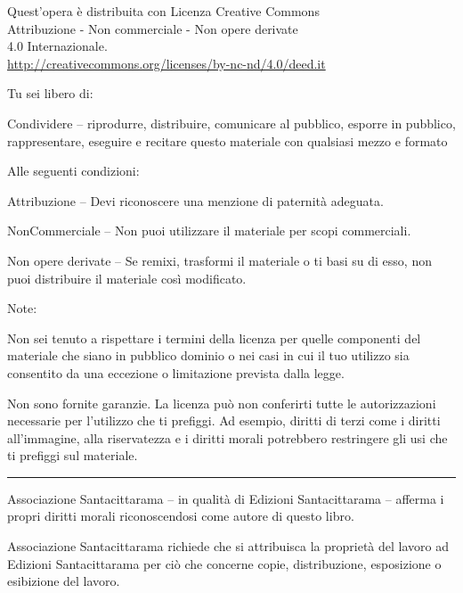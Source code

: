 \clearpage
\thispagestyle{plain}
\vspace*{-4\baselineskip}

{\copyrightsize\setlength{\parindent}{0pt}%
\raggedright\label{copyright-details}
\setlength{\parskip}{8pt}
{\centering

{\large\ccbyncnd}

Quest'opera è distribuita con Licenza Creative Commons\\
Attribuzione - Non commerciale - Non opere derivate\\
4.0 Internazionale.\\
\href{http://creativecommons.org/licenses/by-nc-nd/4.0/deed.it}{http://creativecommons.org/licenses/by-nc-nd/4.0/deed.it}

}

Tu sei libero di:
\begin{packeditemize}
  \item Condividere -- riprodurre, distribuire, comunicare al pubblico, esporre in pubblico, rappresentare, eseguire e recitare questo materiale con qualsiasi mezzo e formato
\end{packeditemize}

Alle seguenti condizioni:

\begin{packeditemize}
\item Attribuzione -- Devi riconoscere una menzione di paternità adeguata.
\item NonCommerciale -- Non puoi utilizzare il materiale per scopi commerciali.
\item Non opere derivate -- Se remixi, trasformi il materiale o ti basi su di esso, non puoi distribuire il materiale così modificato.
\end{packeditemize}

Note:

Non sei tenuto a rispettare i termini della licenza per quelle componenti del
materiale che siano in pubblico dominio o nei casi in cui il tuo utilizzo sia
consentito da una eccezione o limitazione prevista dalla legge.

Non sono fornite garanzie. La licenza può non conferirti tutte le autorizzazioni
necessarie per l'utilizzo che ti prefiggi. Ad esempio, diritti di terzi come i
diritti all'immagine, alla riservatezza e i diritti morali potrebbero
restringere gli usi che ti prefiggi sul materiale.

{\centering
  \color[gray]{0.4}\rule{0.4\linewidth}{0.1pt}%
\par}

Associazione Santacittarama -- in qualità di Edizioni Santacittarama -- afferma
i propri diritti morali riconoscendosi come autore di questo libro.

Associazione Santacittarama richiede che si attribuisca la proprietà del lavoro
ad Edizioni Santacittarama per ciò che concerne copie, distribuzione,
esposizione o esibizione del lavoro.

}